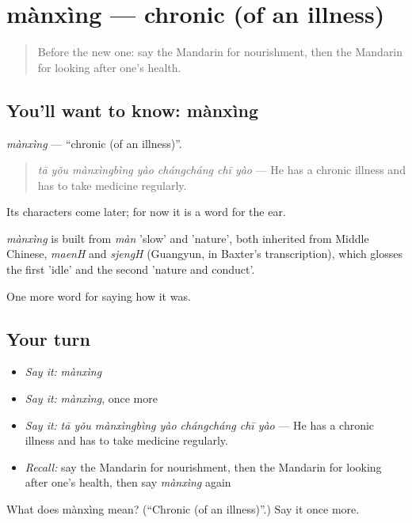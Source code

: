 \section[mànxìng]{mànxìng — chronic (of an illness)}

\label{lesson:ZH-C483-manxing}



\begin{quote}
Before the new one: say the Mandarin for nourishment, then the Mandarin for looking after one's health.
\end{quote}

\subsection*{You'll want to know: mànxìng}
\emph{mànxìng} — \textquotedblleft{}chronic (of an illness)\textquotedblright{}.

\begin{quote}
\emph{tā yǒu mànxìngbìng yào chángcháng chī yào} — He has a chronic illness and has to take medicine regularly.
\end{quote}

Its characters come later; for now it is a word for the ear.

\begin{cousinweb}
\emph{mànxìng} is built from \emph{màn} 'slow' and  'nature', both inherited from Middle Chinese, \emph{maenH} and \emph{sjengH} (Guangyun, in Baxter's transcription), which glosses the first 'idle' and the second 'nature and conduct'.
\end{cousinweb}

\begin{grammarlens}[title={What you've built}]
One more word for saying how it was.
\end{grammarlens}

\subsection*{Your turn}
\begin{itemize}
\raggedright
  \item \emph{Say it:} \emph{mànxìng}
  \item \emph{Say it:} \emph{mànxìng}, once more
  \item \emph{Say it:} \emph{tā yǒu mànxìngbìng yào chángcháng chī yào} — He has a chronic illness and has to take medicine regularly.
  \item \emph{Recall:} say the Mandarin for nourishment, then the Mandarin for looking after one's health, then say \emph{mànxìng} again
\end{itemize}

\begin{tcolorbox}[breakable,colback=teal!4,colframe=teal!35!black,title={Before you move on}]
What does mànxìng mean? (\textquotedblleft{}Chronic (of an illness)\textquotedblright{}.) Say it once more.
\end{tcolorbox}
